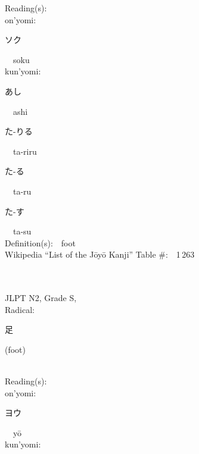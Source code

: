 \begin{multicols}{2}
Reading(s):\ \ \\
{\hspace*{1em}}on'yomi:\ \ \\
{\hspace*{2em}}{\begin{CJK}{UTF8}{min} ソク \end{CJK}}\ \ soku\ \ \\
{\hspace*{1em}}kun'yomi:\ \ \\
{\hspace*{2em}}{\begin{CJK}{UTF8}{min} あし \end{CJK}}\ \ ashi\ \ \\
{\hspace*{2em}}{\begin{CJK}{UTF8}{min} た-りる \end{CJK}}\ \ ta-riru\ \ \\
{\hspace*{2em}}{\begin{CJK}{UTF8}{min} た-る \end{CJK}}\ \ ta-ru\ \ \\
{\hspace*{2em}}{\begin{CJK}{UTF8}{min} た-す \end{CJK}}\ \ ta-su\ \ \\
Definition(s):\ \ foot \\
Wikipedia ``List of the J\=oy\=o Kanji'' Table \#:\ \ 1\,263 \\
\ \ \\
{\fontsize{34pt}{40pt}  }\ \ \\  %
{JLPT N2, Grade S, \\Radical:\ \ {\begin{CJK}{UTF8}{min} 足 \end{CJK}} (foot) } \\
Reading(s):\ \ \\
{\hspace*{1em}}on'yomi:\ \ \\
{\hspace*{2em}}{\begin{CJK}{UTF8}{min} ヨウ \end{CJK}}\ \ y\=o\ \ \\
{\hspace*{1em}}kun'yomi:\ \ \\

\end{multicols}
